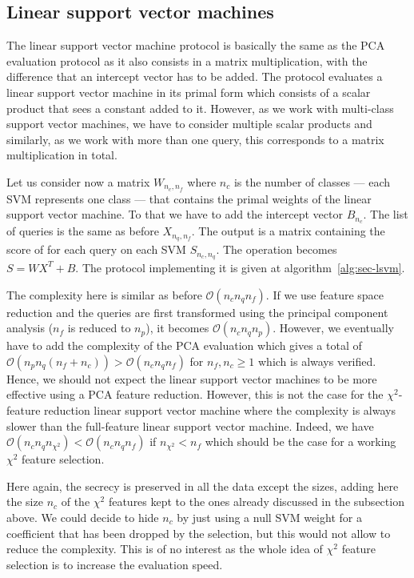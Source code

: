 \subsection{Linear support vector machines}
The linear support vector machine protocol is basically the same as the PCA evaluation protocol as it also consists in a matrix multiplication, with the difference that an intercept vector has to be added. The protocol evaluates a linear support vector machine in its primal form which consists of a scalar product that sees a constant added to it. However, as we work with multi-class support vector machines, we have to consider multiple scalar products and similarly, as we work with more than one query, this corresponds to a matrix multiplication in total.

Let us consider now a matrix $W_{n_c,n_f}$ where $n_c$ is the number of classes --- each SVM represents one class --- that contains the primal weights of the linear support vector machine. To that we have to add the intercept vector $B_{n_c}$. The list of queries is the same as before $X_{n_q , n_f}$. The output is a matrix containing the score of for each query on each SVM $S_{n_c,n_q}$. The operation becomes $S = WX^T + B$. The protocol implementing it is given at algorithm~\ref{alg:sec-lsvm}.

The complexity here is similar as before $\mathcal{O}(n_c n_q n_f)$. If we use feature space reduction and the queries are first transformed using the principal component analysis ($n_f$ is reduced to $n_p$), it becomes $\mathcal{O}(n_c n_q n_p)$. However, we eventually have to add the complexity of the PCA evaluation which gives a total of $\mathcal{O}(n_p n_q (n_f+n_c)) > \mathcal{O}(n_c n_q n_f)$ for $n_f,n_c \geq 1$ which is always verified. Hence, we should not expect the linear support vector machines to be more effective using a PCA feature reduction. However, this is not the case for the $\chi^2$-feature reduction linear support vector machine where the complexity is always slower than the full-feature linear support vector machine. Indeed, we have $\mathcal{O}(n_c n_q n_{\chi^2}) < \mathcal{O}(n_c n_q n_f)$ if $n_{\chi^2} < n_f$ which should be the case for a working $\chi^2$ feature selection.

Here again, the secrecy is preserved in all the data except the sizes, adding here the size $n_c$ of the $\chi^2$ features kept to the ones already discussed in the subsection above. We could decide to hide $n_c$ by just using a null SVM weight for a coefficient that has been dropped by the selection, but this would not allow to reduce the complexity. This is of no interest as the whole idea of $\chi^2$ feature selection is to increase the evaluation speed.

